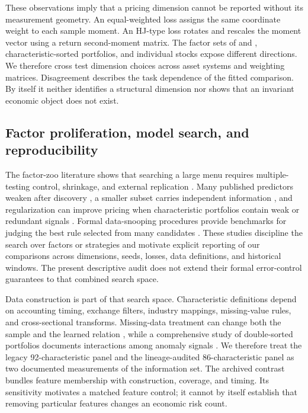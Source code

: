 These observations imply that a pricing dimension cannot be reported without its measurement geometry. An equal-weighted loss assigns the same coordinate weight to each sample moment. An HJ-type loss rotates and rescales the moment vector using a return second-moment matrix. The factor sets of \citet{fama1993common} and \citet{fama2015five}, characteristic-sorted portfolios, and individual stocks expose different directions. We therefore cross test dimension choices across asset systems and weighting matrices. Disagreement describes the task dependence of the fitted comparison. By itself it neither identifies a structural dimension nor shows that an invariant economic object does not exist.

\subsection{Factor proliferation, model search, and reproducibility}

The factor-zoo literature shows that searching a large menu requires multiple-testing control, shrinkage, and external replication \citep{harvey2016cross,feng2020taming,hou2020replicating}. Many published predictors weaken after discovery \citep{mclean2016destroy}, a smaller subset carries independent information \citep{green2017characteristics}, and regularization can improve pricing when characteristic portfolios contain weak or redundant signals \citep{kozak2020shrinking}. Formal data-snooping procedures provide benchmarks for judging the best rule selected from many candidates \citep{white2000reality,hansen2005spa,romano2005stepwise}. These studies discipline the search over factors or strategies and motivate explicit reporting of our comparisons across dimensions, seeds, losses, data definitions, and historical windows. The present descriptive audit does not extend their formal error-control guarantees to that combined search space.

Data construction is part of that search space. Characteristic definitions depend on accounting timing, exchange filters, industry mappings, missing-value rules, and cross-sectional transforms. Missing-data treatment can change both the sample and the learned relation \citep{freyberger2025missing}, while a comprehensive study of double-sorted portfolios documents interactions among anomaly signals \citep{muller2025interacting}. We therefore treat the legacy 92-characteristic panel and the lineage-audited 86-characteristic panel as two documented measurements of the information set. The archived contrast bundles feature membership with construction, coverage, and timing. Its sensitivity motivates a matched feature control; it cannot by itself establish that removing particular features changes an economic risk count.

